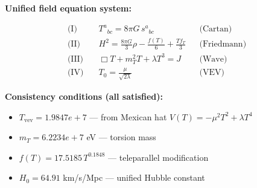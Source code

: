 
\textbf{Unified field equation system:}

\begin{align}
  \text{(I)} \quad & T^a{}_{bc} = 8\pi G \, s^a{}_{bc} && \text{(Cartan)} \\
  \text{(II)} \quad & H^2 = \frac{8\pi G}{3}\rho - \frac{f(T)}{6} + \frac{Tf_T}{3} && \text{(Friedmann)} \\
  \text{(III)} \quad & \Box T + m_T^2 T + \lambda T^3 = J && \text{(Wave)} \\
  \text{(IV)} \quad & T_0 = \frac{\mu}{\sqrt{2\lambda}} && \text{(VEV)}
\end{align}

\textbf{Consistency conditions (all satisfied):}
\begin{itemize}
  \item $T_{\text{vev}} = 1.9847e+7$ — from Mexican hat $V(T) = -\mu^2 T^2 + \lambda T^4$
  \item $m_T = 6.2234e+7$ eV — torsion mass
  \item $f(T) = 17.5185 \, T^{0.1848}$ — teleparallel modification
  \item $H_0 = 64.91$ km/s/Mpc — unified Hubble constant
\end{itemize}
